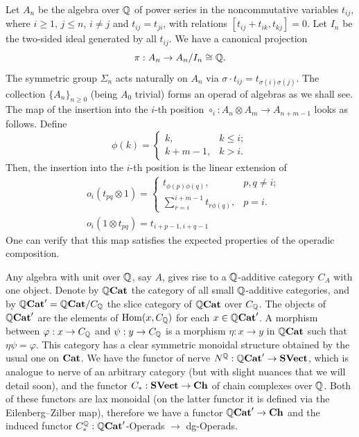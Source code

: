 \documentclass[TFM.tex]{subfiles}
\begin{document}
Let $A_n$ be the algebra over $\mathbb{Q}$ of power series in the noncommutative variables $t_{ij}$, where $i\geq 1$, $j\leq n$, $i\neq j$ and $t_{ij}=t_{ji}$, with relations $[t_{ij}+t_{ik},t_{kj}]=0$. Let $I_n$ be the two-sided ideal generated by all $t_{ij}$. We have a canonical projection 
\begin{equation}\label{canonical}
\pi:A_n\to A_n/I_n\cong\mathbb{Q}.
\end{equation}
The symmetric group $\Sigma_n$ acts naturally on $A_n$ via $\sigma\cdot t_{ij}=t_{\sigma(i)\sigma(j)}$. The collection $\{A_n\}_{n\geq 0}$ (being $A_0$ trivial) forms an operad of algebras as we shall see. The map of the insertion into the $i$-th position $\circ_i: A_n\otimes A_m\to A_{n+m-1}$ looks as follows. Define
\[
\phi(k)=\begin{cases}
k, & k\leq i;\\
k+m-1, & k>i.
\end{cases}
\]
Then, the insertion into the $i$-th position is the linear extension of
\begin{align*}
&o_i(t_{pq}\otimes 1)=\begin{cases}
t_{\phi(p)\phi(q)}, &p,q\neq i;\\
\sum_{r=i}^{i+m-1}t_{r\phi(q)}, & p=i.
\end{cases} \\
& o_i(1\otimes t_{pq})=t_{i+p-1,i+q-1}
\end{align*}
One can verify that this map satisfies the expected properties of the operadic composition. %

Any algebra with unit over $\mathbb{Q}$, say $A$, gives rise to a $\mathbb{Q}$-additive category $C_A$ with one object. Denote by $\mathbb{Q}\mathrm{\mathbf{Cat}}$ the category of all small $\mathbb{Q}$-additive categories, and by $\mathbb{Q}\mathrm{\mathbf{Cat}}'=\mathbb{Q}\mathrm{\mathbf{Cat}}/C_{\mathbb{Q}}$ the slice category of $\mathbb{Q}\mathrm{\mathbf{Cat}}$ over $C_{\mathbb{Q}}$. The objects of $\mathbb{Q}\mathrm{\mathbf{Cat}}'$ are the elements of $\operatorname{Hom}(x, C_{\mathbb{Q}})$ for each $x\in \mathbb{Q}\mathrm{\mathbf{Cat}}'$. A morphism between $\varphi:x\to C_{\mathbb{Q}}$ and $\psi:y\to C_{\mathbb{Q}}$ is a morphism $\eta: x\to y$ in $\mathbb{Q}\mathrm{\mathbf{Cat}}$ such that $\eta\psi=\varphi$.  This category has a clear symmetric monoidal structure obtained by the usual one on $\mathrm{\mathbf{Cat}}$. We have the functor of nerve
$N^{\mathbb{Q}}: \mathbb{Q}\mathrm{\mathbf{Cat}}'\to \mathrm{\mathbf{SVect}}$, which is analogue to nerve of an arbitrary
category (but with slight nuances that we will detail soon), and the functor $C_*: \mathrm{\mathbf{SVect}} \to\mathrm{\mathbf{Ch}}$ of chain complexes over $\mathbb{Q}$. Both of these functors are lax monoidal (on the latter functor it is defined via the Eilenberg–Zilber map), therefore we have a functor $\mathbb{Q}\mathrm{\mathbf{Cat}}'\to\mathrm{\mathbf{Ch}}$ and the induced functor $C_*^{\mathbb{Q}}:\mathbb{Q}\mathrm{\mathbf{Cat}}'$-Operads $\to$ dg-Operads. 
\end{document}
